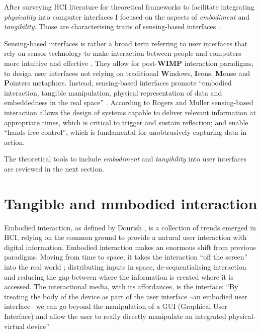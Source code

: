 After surveying HCI literature for theoretical frameworks to facilitate integrating \emph{physicality} into computer interfaces I focused on the aspects of \emph{embodiment} and \emph{tangibility}. Those are characterising traits of sensing-based interfaces \autocite{Benford:2005bo}.

Sensing-based interfaces is rather a broad term referring to user interfaces that rely on sensor technology to make interaction between people and computers more intuitive and effective \autocite{Zhai:2005jm}. They allow for post-\textbf{WIMP} \autocite{VanDam:1997tz} interaction paradigms, to design user interfaces not relying on traditional \textbf{W}indows, \textbf{I}cons, \textbf{M}ouse and \textbf{P}ointers metaphors. Instead, sensing-based interfaces promote ``embodied interaction, tangible manipulation, physical representation of data and embeddedness in the real space'' \autocite{Hornecker:2006uq}. According to Rogers and Muller \autocite*{Rogers:2006te} sensing-based interaction allows the design of systems capable to deliver relevant information at appropriate times, which is critical to trigger and sustain reflection; and enable ``hands-free control'', which is fundamental for unobtrusively capturing data in action.

The theoretical tools to include \emph{embodiment} and \emph{tangibility} into user interfaces are reviewed in the next section.

\section{Tangible and mmbodied interaction}\label{tangible-interfaces-and-embodied-interaction}

Embodied interaction, as defined by Dourish \autocite{Dourish:2001vc}, is a collection of trends emerged in HCI, relying on the common ground to provide a natural user interaction with digital information. Embodied interaction makes an enormous shift from previous paradigms. Moving from time to space, it takes the interaction ``off the screen'' into the real world \autocite{Dourish:2001vc}; distributing inputs in space, de-sequentialising interaction and reducing the gap between where the information is created where it is accessed. The interactional media, with its affordances, is the interface: ``By treating the body of the device as part of the user interface --an embodied user interface-- we can go beyond the manipulation of a GUI (Graphical User Interface) and allow the user to really directly manipulate an integrated physical-virtual device'' \autocite{Fishkin:2000df}

